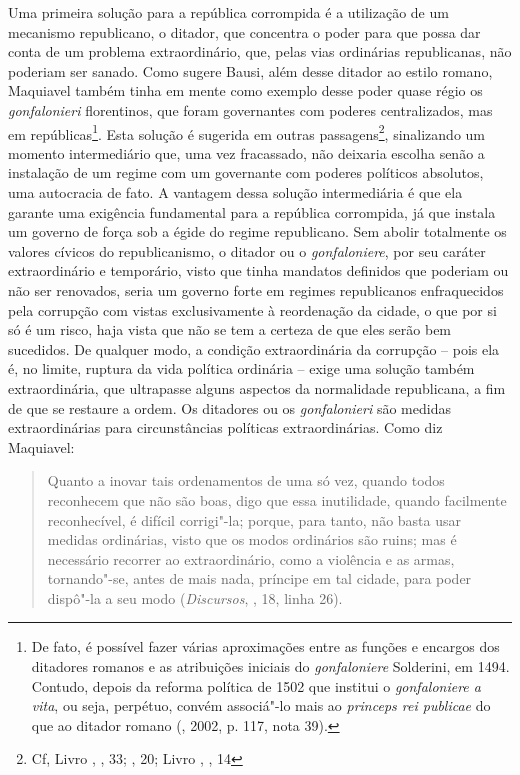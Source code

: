 Uma primeira solução para a república corrompida é a utilização de um
mecanismo republicano, o ditador, que concentra o poder para que possa
dar conta de um problema extraordinário, que, pelas vias ordinárias
republicanas, não poderiam ser sanado. Como sugere Bausi, além desse
ditador ao estilo romano, Maquiavel também tinha em mente como exemplo
desse poder quase régio os \emph{gonfalonieri} florentinos, que foram
governantes com poderes centralizados, mas em repúblicas\footnote{De
  fato, é possível fazer várias aproximações entre as funções e encargos
  dos ditadores romanos e as atribuições iniciais do \emph{gonfaloniere}
  Solderini, em 1494. Contudo, depois da reforma política de 1502 que
  institui o \emph{gonfaloniere a vita}, ou seja, perpétuo, convém
  associá"-lo mais ao \emph{princeps rei publicae} do que ao ditador
  romano (, 2002, p. 117, nota 39).}. Esta solução é sugerida em
outras passagens\footnote{Cf, Livro , , 33; , 20; Livro ,
  , 14}, sinalizando um momento intermediário que, uma vez
fracassado, não deixaria escolha senão a instalação de um regime com um
governante com poderes políticos absolutos, uma autocracia de fato. A
vantagem dessa solução intermediária é que ela garante uma exigência
fundamental para a república corrompida, já que instala um governo de
força sob a égide do regime republicano. Sem abolir totalmente os
valores cívicos do republicanismo, o ditador ou o \emph{gonfaloniere},
por seu caráter extraordinário e temporário, visto que tinha mandatos
definidos que poderiam ou não ser renovados, seria um governo forte em
regimes republicanos enfraquecidos pela corrupção com vistas
exclusivamente à reordenação da cidade, o que por si só é um risco, haja
vista que não se tem a certeza de que eles serão bem sucedidos. De
qualquer modo, a condição extraordinária da corrupção -- pois ela é, no
limite, ruptura da vida política ordinária -- exige uma solução também
extraordinária, que ultrapasse alguns aspectos da normalidade
republicana, a fim de que se restaure a ordem. Os ditadores ou os
\emph{gonfalonieri} são medidas extraordinárias para circunstâncias
políticas extraordinárias. Como diz Maquiavel:

\begin{quote}
Quanto a inovar tais ordenamentos de uma só vez, quando todos reconhecem
que não são boas, digo que essa inutilidade, quando facilmente
reconhecível, é difícil corrigi"-la; porque, para tanto, não basta usar
medidas ordinárias, visto que os modos ordinários são ruins; mas é
necessário recorrer ao extraordinário, como a violência e as armas,
tornando"-se, antes de mais nada, príncipe em tal cidade, para poder
dispô"-la a seu modo (\emph{Discursos}, , 18, linha 26).
\end{quote}

